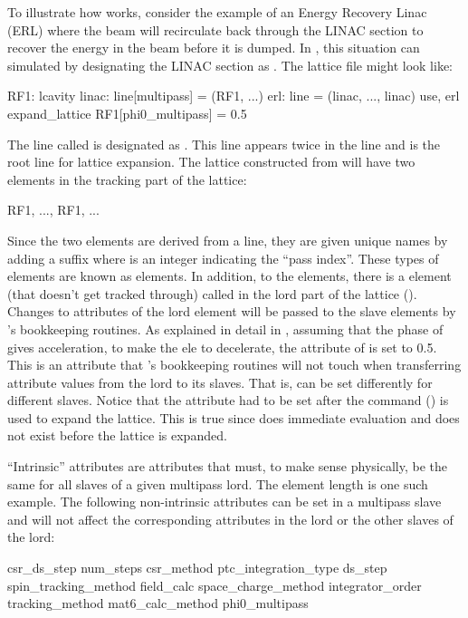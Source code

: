 To illustrate how  works, consider the example of an Energy Recovery Linac (ERL) where
the beam will recirculate back through the LINAC section to recover the energy in the beam before it
is dumped. In \bmad, this situation can simulated by designating the LINAC section as .
The lattice file might look like:
\begin{example}
  RF1: lcavity
  linac: line[multipass] = (RF1, ...)
  erl: line = (linac, ..., linac)
  use, erl
  expand_lattice
  RF1[phi0_multipass] = 0.5
\end{example}
The line called  is designated as . This  line appears twice in
the line  and  is the root line for lattice expansion. The lattice constructed from
 will have two  elements in the tracking part of the lattice:
\begin{example}
  RF1, ..., RF1, ...
\end{example}
Since the two elements are derived from a  line, they are given unique names by adding
a  suffix where  is an integer indicating the ``pass index''. These types of
elements are known as  elements. In addition, to the 
elements, there is a  element (that doesn't get tracked through) called 
in the lord part of the lattice ().  Changes to attributes of the lord 
element will be passed to the slave elements by \bmad's bookkeeping routines. As explained in detail
in , assuming that the phase of  gives acceleration, to make the
 ele to decelerate, the  attribute of  is set to 0.5. This
is an attribute that \bmad's bookkeeping routines will not touch when transferring attribute values
from the lord  to its slaves. That is,  can be set differently for
different slaves. Notice that the  attribute had to be set after the
 command () is used to expand the lattice. This is true since
\bmad does immediate evaluation and  does not exist before the lattice is expanded.

``Intrinsic'' attributes are attributes that must, to make sense physically, be the same for all
slaves of a given multipass lord. The element length is one such example.  The following
non-intrinsic attributes can be set in a multipass slave and will not affect the corresponding
attributes in the lord or the other slaves of the lord:
\begin{example}
  csr_ds_step           num_steps            
  csr_method            ptc_integration_type 
  ds_step               spin_tracking_method 
  field_calc            space_charge_method  
  integrator_order      tracking_method      
  mat6_calc_method      phi0_multipass
\end{example}

